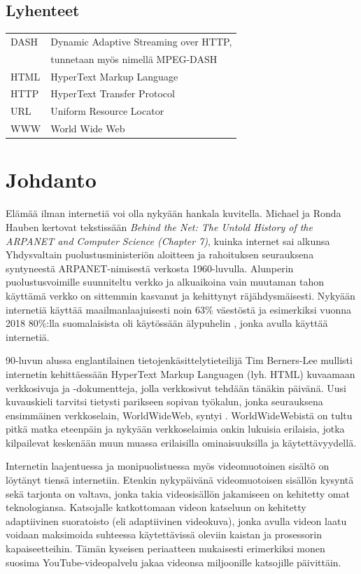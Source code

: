 \documentclass[finnish, 12pt, a4paper, elec, utf8, a-1b, online]{aaltothesis}
\begin{document}
\subsection*{Lyhenteet}
\begin{tabular}{ll}
  DASH      & Dynamic Adaptive Streaming over HTTP, \\
            & tunnetaan myös nimellä MPEG-DASH \\
  HTML      & HyperText Markup Language \\
  HTTP      & HyperText Transfer Protocol \\
  URL       & Uniform Resource Locator \\
  WWW       & World Wide Web \\
\end{tabular}

\cleardoublepage


\section{Johdanto}
  Elämää ilman internetiä voi olla nykyään hankala kuvitella. Michael ja Ronda Hauben kertovat tekstissään \textit{Behind the Net: The Untold History of the ARPANET and Computer Science (Chapter 7)}, kuinka internet sai alkunsa Yhdysvaltain puolustusministeriön aloitteen ja rahoituksen seurauksena syntyneestä ARPANET-nimisestä verkosta 1960-luvulla. \cite{Hauben} Alunperin puolustusvoimille suunniteltu verkko ja alkuaikoina vain muutaman tahon käyttämä verkko on sittemmin kasvanut ja kehittynyt räjähdysmäisesti. Nykyään internetiä käyttää maailmanlaajuisesti noin 63\% väestöstä \cite{ITU} ja esimerkiksi vuonna 2018 80\%:lla suomalaisista oli käytössään älypuhelin \cite{SVT}, jonka avulla käyttää internetiä.

  90-luvun alussa englantilainen tietojenkäsittelytieteilijä Tim Berners-Lee mullisti internetin kehittäessään HyperText Markup Languagen (lyh. HTML) kuvaamaan verkkosivuja ja -dokumentteja, jolla verkkosivut tehdään tänäkin päivänä. Uusi kuvauskieli tarvitsi tietysti parikseen sopivan työkalun, jonka seurauksena ensimmäinen verkkoselain, WorldWideWeb, syntyi \cite{WorldWideWeb}. WorldWideWebistä on tultu pitkä matka eteenpäin ja nykyään verkkoselaimia onkin lukuisia erilaisia, jotka kilpailevat keskenään muun muassa erilaisilla ominaisuuksilla ja käytettävyydellä.

  Internetin laajentuessa ja monipuolistuessa myös videomuotoinen sisältö on löytänyt tiensä internetiin. Etenkin nykypäivänä videomuotoisen sisällön kysyntä sekä tarjonta on valtava, jonka takia videosisällön jakamiseen on kehitetty omat teknologiansa. Katsojalle katkottomaan videon katseluun on kehitetty adaptiivinen suoratoisto (eli adaptiivinen videokuva), jonka avulla videon laatu voidaan maksimoida suhteessa käytettävissä oleviin kaistan ja prosessorin kapaiseetteihin. Tämän kyseisen periaatteen mukaisesti erimerkiksi monen suosima YouTube-videopalvelu jakaa videonsa miljoonille katsojille päivittäin.
\end{document}
